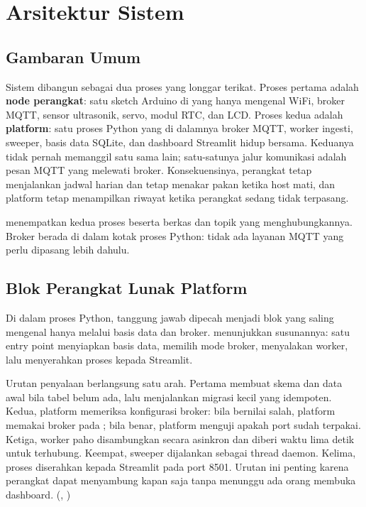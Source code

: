 \chapter{Arsitektur Sistem}
\label{ch:02-arsitektur}

\section{Gambaran Umum}

Sistem dibangun sebagai dua proses yang longgar terikat. Proses pertama adalah
\textbf{node perangkat}: satu sketch Arduino di \BoardName{} yang hanya mengenal
WiFi, broker MQTT, sensor ultrasonik, servo, modul RTC, dan LCD. Proses kedua adalah
\textbf{platform}: satu proses Python yang di dalamnya broker MQTT, worker ingesti,
sweeper, basis data SQLite, dan dashboard Streamlit hidup bersama. Keduanya tidak
pernah memanggil satu sama lain; satu-satunya jalur komunikasi adalah pesan MQTT
yang melewati broker. Konsekuensinya, perangkat tetap menjalankan jadwal harian dan
tetap menakar pakan ketika host mati, dan platform tetap menampilkan riwayat ketika
perangkat sedang tidak terpasang.

 menempatkan kedua proses beserta berkas dan topik yang
menghubungkannya. Broker berada di dalam kotak proses Python: tidak ada layanan
MQTT yang perlu dipasang lebih dahulu.


\section{Blok Perangkat Lunak Platform}

Di dalam proses Python, tanggung jawab dipecah menjadi blok yang saling mengenal
hanya melalui basis data dan broker.  menunjukkan
susunannya: satu entry point menyiapkan basis data, memilih mode broker, menyalakan
worker, lalu menyerahkan proses kepada Streamlit.


Urutan penyalaan berlangsung satu arah. Pertama  membuat skema
dan data awal bila tabel  belum ada, lalu menjalankan migrasi kecil
yang idempoten. Kedua, platform memeriksa konfigurasi broker: bila
 bernilai salah, platform memakai broker pada ;
bila benar, platform menguji apakah port sudah terpakai. Ketiga, worker paho
disambungkan secara asinkron dan diberi waktu lima detik untuk terhubung. Keempat,
sweeper dijalankan sebagai thread daemon. Kelima, proses diserahkan kepada Streamlit
pada port 8501. Urutan ini penting karena perangkat dapat menyambung kapan saja
tanpa menunggu ada orang membuka dashboard. (,
)

